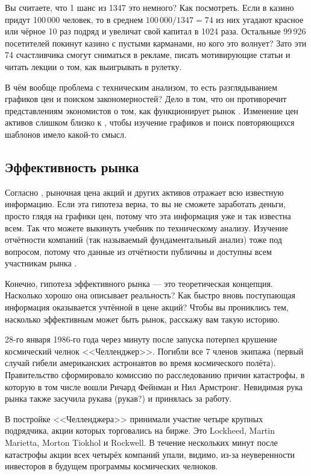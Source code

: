 Вы считаете, что 1 шанс из 1347 это немного? Как посмотреть. Если в казино 
придут 100\,000 человек, то в среднем $100\,000/1347 = 74$ из них угадают 
красное или чёрное 10 раз подряд и увеличат свой капитал в 1024 раза. Остальные 
99\,926 посетителей покинут казино с пустыми карманами, но кого это волнует? 
Зато эти 74 счастливчика смогут сниматься в рекламе, писать мотивирующие статьи 
и читать лекции о том, как выигрывать в рулетку.

В чём вообще проблема с техническим анализом, то есть разглядыванием графиков
цен и поиском закономерностей? Дело в том, что он противоречит представлениям
экономистов о том, как функционирует рынок \cite[ch.~11.2]
{bodie2014investments}. Изменение цен активов слишком близко к , чтобы изучение графиков и поиск повторяющихся шаблонов 
имело какой-то смысл.

\subsection{Эффективность рынка}

Согласно ,
рыночная цена акций и других активов отражает всю известную информацию. Если 
эта гипотеза верна, то вы не сможете заработать деньги, просто глядя на графики 
цен, потому что эта информация уже и так известна всем. Так что можете выкинуть 
учебник по техническому анализу. Изучение отчётности компаний (так называемый 
фундаментальный анализ) тоже под вопросом, потому что данные из отчётности 
публичны и доступны всем участникам рынка \cite[ch.~11]
{bodie2014investments}.

Конечно, гипотеза эффективного рынка --- это теоретическая концепция. Насколько
хорошо она описывает реальность? Как быстро вновь поступающая информация
оказывается учтённой в цене акций? Чтобы вы прониклись тем, насколько 
эффективным может быть рынок, расскажу вам такую историю.

28-го января 1986-го года через минуту после запуска потерпел крушение 
космический челнок <<Челленджер>>. Погибли все 7 членов экипажа (первый случай 
гибели американских астронавтов во время космического полёта). Правительство 
сформировало комиссию по расследованию причин катастрофы, в которую в том числе 
вошли Ричард Фейнман и Нил Армстронг. Невидимая рука рынка также засучила рукава 
(рукав?) и принялась за работу. 

В постройке <<Челленджера>> принимали участие четыре крупных подрядчика, акции 
которых торговались на бирже. Это Lockheed, Martin Marietta, Morton Tiokhol и 
Rockwell. В течение нескольких минут после катастрофы акции всех четырёх 
компаний упали, видимо, из-за неуверенности инвесторов в будущем программы 
космических челноков.


